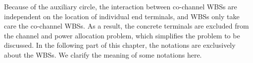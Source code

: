 \documentclass[times]{ettauth}
\theoremstyle{mytheoremstyle}
\theoremstyle{mytheoremstyle}
\theoremstyle{mytheoremstyle}
\begin{document}


Because of the auxiliary circle, the interaction between co-channel WBSs are independent on the location of individual end terminals, and WBSs only take care the co-channel WBSs. 
As a result,  the concrete terminals are excluded from the channel and power allocation problem, which simplifies the problem to be discussed. 
In the following part of this chapter, the notations are exclusively about the WBSs.
We clarify the meaning of some notations here.
\end{document}

